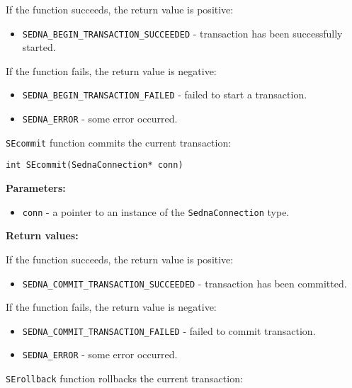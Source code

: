 \documentclass[a4paper,12pt]{article}
\newenvironment{citemize}
{\begin{itemize}
  \setlength{\itemsep}{0pt}
  \setlength{\parskip}{0pt}
  \setlength{\parsep}{0pt}}
{\end{itemize}}
\begin{document}
\medskip

\noindent
If the function succeeds, the return value is positive:

\begin{citemize}
\item\verb!SEDNA_BEGIN_TRANSACTION_SUCCEEDED! - transaction has been
successfully started.
\end{citemize}

\noindent
If the function fails, the return value is negative:

\begin{citemize}
\item\verb!SEDNA_BEGIN_TRANSACTION_FAILED! - failed to start a transaction.
\item\verb!SEDNA_ERROR! - some error occurred.
\end{citemize}

\verb!SEcommit! function commits the current transaction:

\begin{verbatim}
int SEcommit(SednaConnection* conn)
\end{verbatim}

\noindent
\textbf{Parameters:}

\begin{citemize}
\item\verb!conn! - a pointer to an instance of the \verb!SednaConnection! type.
\end{citemize}

\noindent
\textbf{Return values:}

\medskip

\noindent
If the function succeeds, the return value is positive:

\begin{citemize}
\item\verb!SEDNA_COMMIT_TRANSACTION_SUCCEEDED! - transaction has been committed.
\end{citemize}

\noindent
If the function fails, the return value is negative:

\begin{citemize}
\item\verb!SEDNA_COMMIT_TRANSACTION_FAILED! - failed to commit transaction.
\item\verb!SEDNA_ERROR! - some error occurred.
\end{citemize}

\verb!SErollback! function rollbacks the current transaction:
\end{document}
